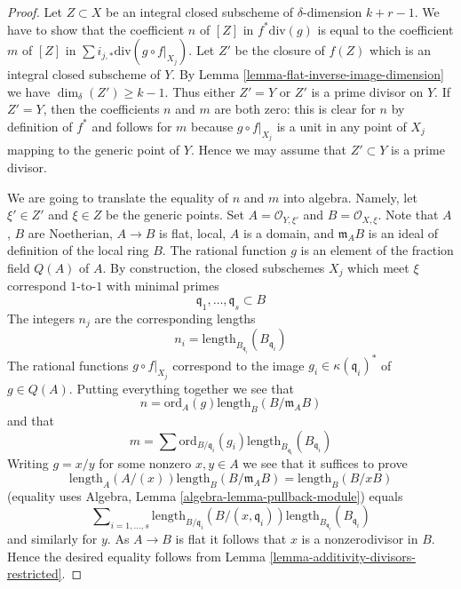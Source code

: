 \documentclass[10pt,a4paper]{amsart}
\theoremstyle{plain}
\theoremstyle{definition}
\theoremstyle{remark}
\numberwithin{equation}{subsection}
\begin{document}
\begin{proof}
Let $Z \subset X$ be an integral closed subscheme of $\delta$-dimension
$k + r - 1$. We have to show that the coefficient $n$ of $[Z]$ in
$f^*\text{div}(g)$ is equal to the coefficient
$m$ of $[Z]$ in $\sum i_{j, *} \text{div}(g \circ f|_{X_j})$.
Let $Z'$ be the closure of $f(Z)$ which is an integral closed
subscheme of $Y$. By Lemma \ref{lemma-flat-inverse-image-dimension}
we have $\dim_\delta(Z') \geq k - 1$. Thus either $Z' = Y$
or $Z'$ is a prime divisor on $Y$. If $Z' = Y$, then the coefficients
$n$ and $m$ are both zero: this is clear for $n$ by definition
of $f^*$ and follows for $m$ because $g \circ f|_{X_j}$ is
a unit in any point of $X_j$ mapping to the generic point of $Y$.
Hence we may assume that $Z' \subset Y$ is a prime divisor.

\medskip\noindent
We are going to translate the equality of $n$ and $m$ into algebra.
Namely, let $\xi' \in Z'$ and $\xi \in Z$ be the generic points.
Set $A = \mathcal{O}_{Y, \xi'}$ and $B = \mathcal{O}_{X, \xi}$.
Note that $A$, $B$ are Noetherian, $A \to B$ is flat, local,
$A$ is a domain, and $\mathfrak m_AB$ is an ideal of definition
of the local ring $B$. The rational function $g$ is an element
of the fraction field $Q(A)$ of $A$.
By construction, the closed subschemes $X_j$
which meet $\xi$ correspond $1$-to-$1$ with minimal primes
$$
\mathfrak q_1, \ldots, \mathfrak q_s \subset B
$$
The integers $n_j$ are the corresponding lengths
$$
n_i = \text{length}_{B_{\mathfrak q_i}}(B_{\mathfrak q_i})
$$
The rational functions $g \circ f|_{X_j}$ correspond to the image
$g_i \in \kappa(\mathfrak q_i)^*$ of $g \in Q(A)$.
Putting everything together we see that
$$
n = \text{ord}_A(g) \text{length}_B(B/\mathfrak m_AB)
$$
and that
$$
m = \sum \text{ord}_{B/\mathfrak q_i}(g_i)
\text{length}_{B_{\mathfrak q_i}}(B_{\mathfrak q_i})
$$
Writing $g = x/y$ for some nonzero $x, y \in A$ we see that it suffices
to prove
$$
\text{length}_A(A/(x)) \text{length}_B(B/\mathfrak m_AB) =
\text{length}_B(B/xB)
$$
(equality uses Algebra, Lemma \ref{algebra-lemma-pullback-module})
equals
$$
\sum\nolimits_{i = 1, \ldots, s}
\text{length}_{B/\mathfrak q_i}(B/(x, \mathfrak q_i))
\text{length}_{B_{\mathfrak q_i}}(B_{\mathfrak q_i})
$$
and similarly for $y$. As $A \to B$ is flat it follows that $x$
is a nonzerodivisor in $B$. Hence the desired equality follows from
Lemma \ref{lemma-additivity-divisors-restricted}.
\end{proof}
\end{document}
